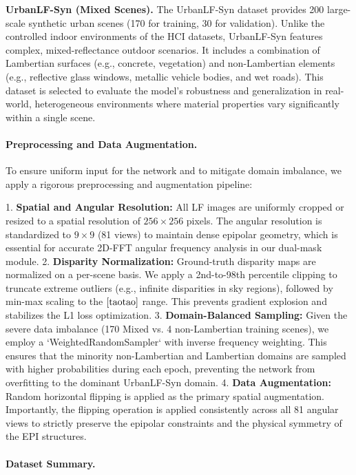 \documentclass[lettersize,journal]{IEEEtran}
\begin{document}
\textbf{UrbanLF-Syn (Mixed Scenes).} 
The UrbanLF-Syn  dataset provides 200 large-scale synthetic urban scenes (170 for training, 30 for validation). Unlike the controlled indoor environments of the HCI datasets, UrbanLF-Syn features complex, mixed-reflectance outdoor scenarios. It includes a combination of Lambertian surfaces (e.g., concrete, vegetation) and non-Lambertian elements (e.g., reflective glass windows, metallic vehicle bodies, and wet roads). This dataset is selected to evaluate the model's robustness and generalization in real-world, heterogeneous environments where material properties vary significantly within a single scene.

\paragraph{Preprocessing and Data Augmentation.}

To ensure uniform input for the network and to mitigate domain imbalance, we apply a rigorous preprocessing and augmentation pipeline:

1. \textbf{Spatial and Angular Resolution:} All LF images are uniformly cropped or resized to a spatial resolution of $256 \times 256$ pixels. The angular resolution is standardized to $9 \times 9$ (81 views) to maintain dense epipolar geometry, which is essential for accurate 2D-FFT angular frequency analysis in our dual-mask module.
2. \textbf{Disparity Normalization:} Ground-truth disparity maps are normalized on a per-scene basis. We apply a 2nd-to-98th percentile clipping to truncate extreme outliers (e.g., infinite disparities in sky regions), followed by min-max scaling to the $\cite{taotao}$ range. This prevents gradient explosion and stabilizes the L1 loss optimization.
3. \textbf{Domain-Balanced Sampling:} Given the severe data imbalance (170 Mixed vs. 4 non-Lambertian training scenes), we employ a `WeightedRandomSampler` with inverse frequency weighting. This ensures that the minority non-Lambertian and Lambertian domains are sampled with higher probabilities during each epoch, preventing the network from overfitting to the dominant UrbanLF-Syn domain.
4. \textbf{Data Augmentation:} Random horizontal flipping is applied as the primary spatial augmentation. Importantly, the flipping operation is applied consistently across all 81 angular views to strictly preserve the epipolar constraints and the physical symmetry of the EPI structures.

\paragraph{Dataset Summary.}
\end{document}
